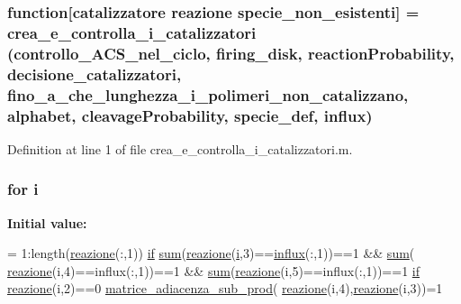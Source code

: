 \hypertarget{a00062_a5e47fda8cc2a1711ddabe11a14ba8ecb}{
\subsubsection[{function}]{\setlength{\rightskip}{0pt plus 5cm}function\mbox{[}{\bf catalizzatore} {\bf reazione} {\bf specie\-\_\-non\-\_\-esistenti}\mbox{]} = {\bf crea\-\_\-e\-\_\-controlla\-\_\-i\-\_\-catalizzatori} (controllo\-\_\-\-A\-C\-S\-\_\-nel\-\_\-ciclo, {\bf firing\-\_\-disk}, {\bf reaction\-Probability}, {\bf decisione\-\_\-catalizzatori}, {\bf fino\-\_\-a\-\_\-che\-\_\-lunghezza\-\_\-i\-\_\-polimeri\-\_\-non\-\_\-catalizzano}, {\bf alphabet}, {\bf cleavage\-Probability}, {\bf specie\-\_\-def}, {\bf influx})}}\label{a00062_a5e47fda8cc2a1711ddabe11a14ba8ecb}


Definition at line 1 of file crea\-\_\-e\-\_\-controlla\-\_\-i\-\_\-catalizzatori.\-m.

\hypertarget{a00062_a6f6ccfcf58b31cb6412107d9d5281426}{
\subsubsection[{i}]{\setlength{\rightskip}{0pt plus 5cm}for i}}\label{a00062_a6f6ccfcf58b31cb6412107d9d5281426}
{\bfseries Initial value\-:}
\begin{DoxyCode}
= 1:length(\hyperlink{a00060_a84d78e886b9f683403579e3911e7f046}{reazione}(:,1))
                \hyperlink{a00025_adf3394dfd4755fd0ef2854fe558ff8aa}{if} \hyperlink{a00028_a576bebae86b11914280920c448def53d}{sum}(\hyperlink{a00060_a84d78e886b9f683403579e3911e7f046}{reazione}(\hyperlink{a00027_a1de1a45bc56b002aa1ad94bb5f54a1ca}{i},3)==\hyperlink{a00028_a637d2af7e7b03600bcaf1931b999e3fc}{influx}(:,1))==1 && \hyperlink{a00028_a576bebae86b11914280920c448def53d}{sum}(
      \hyperlink{a00060_a84d78e886b9f683403579e3911e7f046}{reazione}(i,4)==influx(:,1))==1 && \hyperlink{a00028_a576bebae86b11914280920c448def53d}{sum}(\hyperlink{a00060_a84d78e886b9f683403579e3911e7f046}{reazione}(i,5)==influx(:,1))==1
                    \hyperlink{a00025_adf3394dfd4755fd0ef2854fe558ff8aa}{if} \hyperlink{a00060_a84d78e886b9f683403579e3911e7f046}{reazione}(i,2)==0                        
                        \hyperlink{a00062_a75ff61c394ad5be40e5084b8b794e2b2}{matrice\_adiacenza\_sub\_prod}(
      \hyperlink{a00060_a84d78e886b9f683403579e3911e7f046}{reazione}(i,4),\hyperlink{a00060_a84d78e886b9f683403579e3911e7f046}{reazione}(i,3))=1
\end{DoxyCode}


